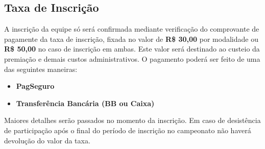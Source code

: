 \subsection{Taxa de Inscrição}

A inscrição da equipe só será confirmada mediante verificação do comprovante de pagamente da taxa de inscrição, fixada no valor de \textbf{R\$ 30,00} por modalidade ou \textbf{R\$ 50,00} no caso de inscrição em ambas. Este valor será destinado ao custeio da premiação e demais custos administrativos. O pagamento poderá ser feito de uma das seguintes maneiras:

\begin{itemize}
	\item \textbf{PagSeguro}
	\item \textbf{Transferência Bancária (BB ou Caixa)}
\end{itemize}

Maiores detalhes serão passados no momento da inscrição. Em caso de desistência de participação após o final do período de inscrição no campeonato não haverá devolução do valor da taxa.

